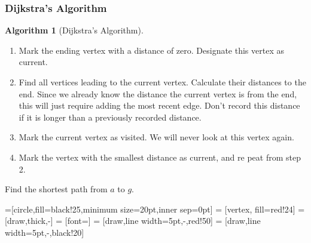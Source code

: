 \documentclass{beamer}
\theoremstyle{definition}
\newtheorem{algorithm}[theorem]{Algorithm}
\begin{document}
\begin{frame}
\frametitle{Dijkstra's Algorithm}

\begin{algorithm}[Dijkstra's Algorithm]
\begin{enumerate}
\item Mark the ending vertex with a distance of zero.  Designate this vertex as current.
\item Find all vertices leading to the current vertex.  Calculate their distances to the end.  
Since we already know the distance the current vertex is from the end, this will just 
require adding the most recent edge.  Don't record this distance if it is longer than a 
previously recorded distance.
\item Mark the current vertex as visited.  We will never look at this vertex again.
\item Mark the vertex with the smallest distance as current, and re
peat from step 2.
\end{enumerate}
\end{algorithm}
\end{frame}

\begin{frame}
Find the shortest path from $a$ to $g$.

=[circle,fill=black!25,minimum size=20pt,inner sep=0pt]
 = [vertex, fill=red!24]
 = [draw,thick,-]
 = [font=\small]
 = [draw,line width=5pt,-,red!50]
 = [draw,line width=5pt,-,black!20]


\begin{figure}
\end{figure}
\end{frame}
\end{document}
